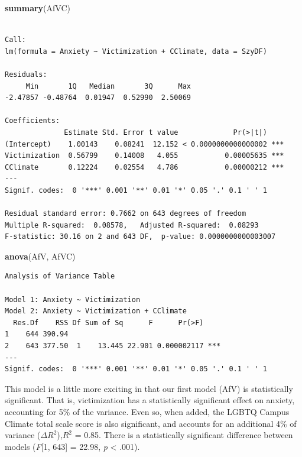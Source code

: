 \documentclass[
  english,
]{book}
\newenvironment{Shaded}{\begin{snugshade}}{\end{snugshade}}
\newcommand{\KeywordTok}[1]{\textcolor[rgb]{0.13,0.29,0.53}{\textbf{#1}}}
\newcommand{\NormalTok}[1]{#1}
\begin{document}
\begin{Shaded}
\begin{Highlighting}[]
\KeywordTok{summary}\NormalTok{(AfVC)}
\end{Highlighting}
\end{Shaded}

\begin{verbatim}

Call:
lm(formula = Anxiety ~ Victimization + CClimate, data = SzyDF)

Residuals:
     Min       1Q   Median       3Q      Max 
-2.47857 -0.48764  0.01947  0.52990  2.50069 

Coefficients:
              Estimate Std. Error t value             Pr(>|t|)    
(Intercept)    1.00143    0.08241  12.152 < 0.0000000000000002 ***
Victimization  0.56799    0.14008   4.055           0.00005635 ***
CClimate       0.12224    0.02554   4.786           0.00000212 ***
---
Signif. codes:  0 '***' 0.001 '**' 0.01 '*' 0.05 '.' 0.1 ' ' 1

Residual standard error: 0.7662 on 643 degrees of freedom
Multiple R-squared:  0.08578,   Adjusted R-squared:  0.08293 
F-statistic: 30.16 on 2 and 643 DF,  p-value: 0.0000000000003007
\end{verbatim}

\begin{Shaded}
\begin{Highlighting}[]
\KeywordTok{anova}\NormalTok{(AfV, AfVC)}
\end{Highlighting}
\end{Shaded}

\begin{verbatim}
Analysis of Variance Table

Model 1: Anxiety ~ Victimization
Model 2: Anxiety ~ Victimization + CClimate
  Res.Df    RSS Df Sum of Sq      F      Pr(>F)    
1    644 390.94                                    
2    643 377.50  1    13.445 22.901 0.000002117 ***
---
Signif. codes:  0 '***' 0.001 '**' 0.01 '*' 0.05 '.' 0.1 ' ' 1
\end{verbatim}

This model is a little more exciting in that our first model (AfV) is statistically significant. That is, victimization has a statistically significant effect on anxiety, accounting for 5\% of the variance. Even so, when added, the LGBTQ Campus Climate total scale score is also significant, and accounts for an additional 4\% of variance (\(\Delta{R^2}\)),\(R^2\) = 0.85. There is a statistically significant difference between models (\emph{F}{[}1, 643{]} = 22.98, \emph{p} \textless{} .001).
\end{document}
